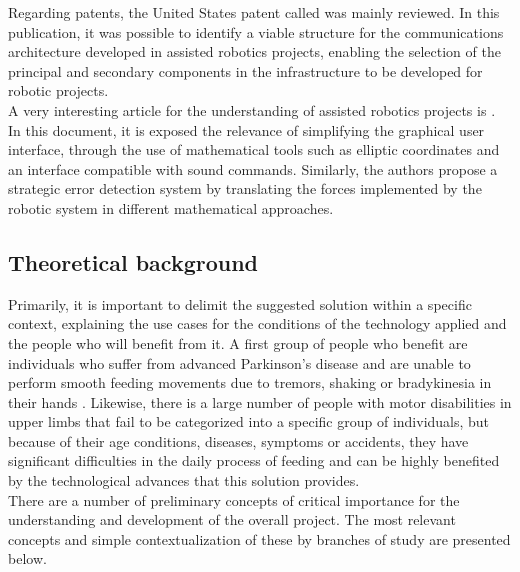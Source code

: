 \documentclass[11pt]{report} %
\begin{document}
Regarding patents, the United States patent called  \citep{cite_patent_mobile_human_friendly_assistive_robot} was mainly reviewed. In this publication, it was possible to identify a viable structure for the communications architecture developed in assisted robotics projects, enabling the selection of the principal and secondary components in the infrastructure to be developed for robotic projects.\\


A very interesting article for the understanding of assisted robotics projects is  \citep{cite_robot_for_humanity_empower_people_with_disabilities}. In this document, it is exposed the relevance of simplifying the graphical user interface, through the use of mathematical tools such as elliptic coordinates and an interface compatible with sound commands. Similarly, the authors propose a strategic error detection system by translating the forces implemented by the robotic system in different mathematical approaches.\\


\subsection{Theoretical background}

Primarily, it is important to delimit the suggested solution within a specific context, explaining the use cases for the conditions of the technology applied and the people who will benefit from it. A first group of people who benefit are individuals who suffer from advanced Parkinson's disease and are unable to perform smooth feeding movements due to tremors, shaking or bradykinesia in their hands \citep{cite_parkinsons_disease_symptomps_mayo_clinic}. Likewise, there is a large number of people with motor disabilities in upper limbs that fail to be categorized into a specific group of individuals, but because of their age conditions, diseases, symptoms or accidents, they have significant difficulties in the daily process of feeding and can be highly benefited by the technological advances that this solution provides.\\

There are a number of preliminary concepts of critical importance for the understanding and development of the overall project. The most relevant concepts and simple contextualization of these by branches of study are presented below.\\
\end{document}
